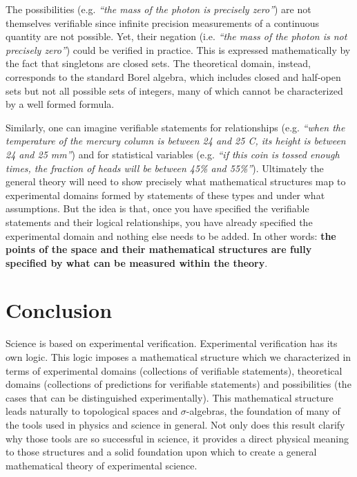\documentclass[letterpaper]{article}
\theoremstyle{plain}%
\theoremstyle{definition}
\theoremstyle{remark}
\numberwithin{equation}{section}
\newcommand{\statement}[1] {\emph{``#1''}}
\begin{document}
The possibilities (e.g. \statement{the mass of the photon is precisely zero}) are not themselves verifiable since infinite precision measurements of a continuous quantity are not possible. Yet, their negation (i.e. \statement{the mass of the photon is not precisely zero}) could be verified in practice. This is expressed mathematically by the fact that singletons are closed sets. The theoretical domain, instead, corresponds to the standard Borel algebra, which includes closed and half-open sets but not all possible sets of integers, many of which cannot be characterized by a well formed formula.

Similarly, one can imagine verifiable statements for relationships (e.g. \statement{when the temperature of the mercury column is between 24 and 25 C, its height is between 24 and 25 mm}) and for statistical variables (e.g. \statement{if this coin is tossed enough times, the fraction of heads will be between 45\% and 55\%}). Ultimately the general theory will need to show precisely what mathematical structures map to experimental domains formed by statements of these types and under what assumptions. But the idea is that, once you have specified the verifiable statements and their logical relationships, you have already specified the experimental domain and nothing else needs to be added. In other words: \textbf{the points of the space and their mathematical structures are fully specified by what can be measured within the theory}.

\section{Conclusion}

Science is based on experimental verification. Experimental verification has its own logic. This logic imposes a mathematical structure which we characterized in terms of experimental domains (collections of verifiable statements), theoretical domains (collections of predictions for verifiable statements) and possibilities (the cases that can be distinguished experimentally). This mathematical structure leads naturally to topological spaces and $\sigma$-algebras, the foundation of many of the tools used in physics and science in general. Not only does this result clarify why those tools are so successful in science, it provides a direct physical meaning to those structures and a solid foundation upon which to create a general mathematical theory of experimental science.
\end{document}
